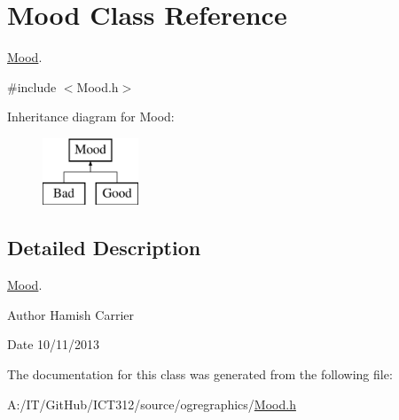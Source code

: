 \hypertarget{class_mood}{\section{Mood Class Reference}
\label{class_mood}
}


\hyperlink{class_mood}{Mood}.  




{\ttfamily \#include $<$Mood.\-h$>$}

Inheritance diagram for Mood\-:\begin{figure}[H]
\begin{center}
\leavevmode
\includegraphics[height=2.000000cm]{class_mood}
\end{center}
\end{figure}


\subsection{Detailed Description}
\hyperlink{class_mood}{Mood}. 

\begin{DoxyAuthor}{Author}
Hamish Carrier 
\end{DoxyAuthor}
\begin{DoxyDate}{Date}
10/11/2013 
\end{DoxyDate}


The documentation for this class was generated from the following file\-:\begin{DoxyCompactItemize}
\item 
A\-:/\-I\-T/\-Git\-Hub/\-I\-C\-T312/source/ogregraphics/\hyperlink{_mood_8h}{Mood.\-h}\end{DoxyCompactItemize}
